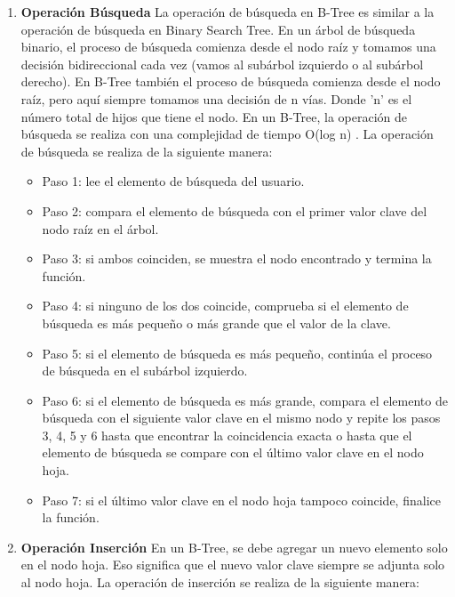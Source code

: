\documentclass{article}
\begin{document}
	\begin{enumerate}

		\item \textbf{Operación Búsqueda}
		La operación de búsqueda en B-Tree es similar a la operación de búsqueda en Binary Search Tree. En un árbol de búsqueda binario, el proceso de búsqueda comienza desde el nodo raíz y tomamos una decisión bidireccional cada vez (vamos al subárbol izquierdo o al subárbol derecho). En B-Tree también el proceso de búsqueda comienza desde el nodo raíz, pero aquí siempre tomamos una decisión de n vías. Donde 'n' es el número total de hijos que tiene el nodo. En un B-Tree, la operación de búsqueda se realiza con una complejidad de tiempo O(log n) . La operación de búsqueda se realiza de la siguiente manera:
		
		\begin{itemize}
		\item Paso 1: lee el elemento de búsqueda del usuario.
		\item Paso 2: compara el elemento de búsqueda con el primer valor clave del nodo raíz en el árbol. 
		\item Paso 3: si ambos coinciden, se muestra el nodo encontrado y termina la función.
		\item Paso 4: si ninguno de los dos coincide, comprueba si el elemento de búsqueda es más pequeño o más grande que el valor de la clave.
		\item Paso 5: si el elemento de búsqueda es más pequeño, continúa el proceso de búsqueda en el subárbol izquierdo.
		\item Paso 6: si el elemento de búsqueda es más grande, compara el elemento de búsqueda con el siguiente valor clave en el mismo nodo y repite los pasos 3, 4, 5 y 6 hasta que encontrar la coincidencia exacta o hasta que el elemento de búsqueda se compare con el último valor clave en el nodo hoja.
		\item Paso 7: si el último valor clave en el nodo hoja tampoco coincide, finalice la función.
		\end{itemize}


			\item \textbf{Operación Inserción}
			En un B-Tree, se debe agregar un nuevo elemento solo en el nodo hoja. Eso significa que el nuevo valor clave siempre se adjunta solo al nodo hoja. La operación de inserción se realiza de la siguiente manera:
			

\end{enumerate}
\end{document}
